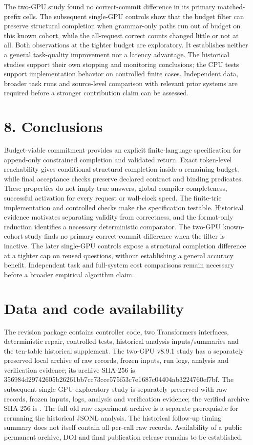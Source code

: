 \documentclass[
  12pt,
  a4paper,
]{article}
\begin{document}
The two-GPU study found no correct-commit difference in its primary matched-prefix cells. The subsequent single-GPU controls show that the budget filter can preserve structural completion when grammar-only paths run out of budget on this known cohort, while the all-request correct counts changed little or not at all. Both observations at the tighter budget are exploratory. It establishes neither a general task-quality improvement nor a latency advantage. The historical studies support their own stopping and monitoring conclusions; the CPU tests support implementation behavior on controlled finite cases. Independent data, broader task runs and source-level comparison with relevant prior systems are required before a stronger contribution claim can be assessed.

\section{8. Conclusions}

Budget-viable commitment provides an explicit finite-language specification for append-only constrained completion and validated return. Exact token-level reachability gives conditional structural completion inside a remaining budget, while final acceptance checks preserve declared contract and binding predicates. These properties do not imply true answers, global compiler completeness, successful activation for every request or wall-clock speed. The finite-trie implementation and controlled checks make the specification testable. Historical evidence motivates separating validity from correctness, and the format-only reduction identifies a necessary deterministic comparator. The two-GPU known-cohort study finds no primary correct-commit difference when the filter is inactive. The later single-GPU controls expose a structural completion difference at a tighter cap on reused questions, without establishing a general accuracy benefit. Independent task and full-system cost comparisons remain necessary before a broader empirical algorithm claim.

\section{Data and code availability}

The revision package contains controller code, two Transformers interfaces, deterministic repair, controlled tests, historical analysis inputs/summaries and the ten-table historical supplement. The two-GPU v8.9.1 study has a separately preserved local archive of raw records, frozen inputs, run logs, analysis and verification evidence; its archive SHA-256 is 356984d29742605b26261bb7cc73cce575f53c7e1687c04404ab3224760ef7bf. The subsequent single-GPU exploratory study is separately preserved with raw records, frozen inputs, logs, analysis and verification evidence; the verified archive SHA-256 is . The full old raw experiment archive is a separate prerequisite for rerunning the historical JSONL analysis. The historical follow-up timing summary does not itself contain all per-call raw records. Availability of a public permanent archive, DOI and final publication release remains to be established.
\end{document}
